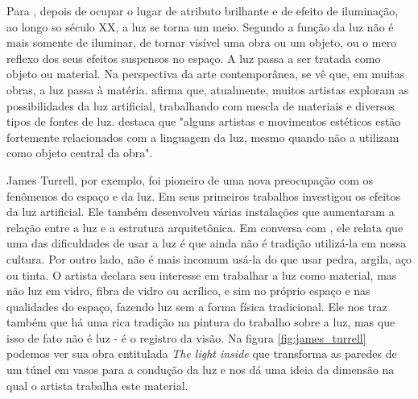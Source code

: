 Para , depois de ocupar o lugar de atributo brilhante e de efeito de iluminação, ao longo so século XX, a luz se torna um meio. Segundo  a função da luz não é mais somente de iluminar, de tornar visível uma obra ou um objeto, ou o mero reflexo dos seus efeitos suspensos no espaço. A luz passa a ser tratada como objeto ou material. Na perspectiva da arte contemporânea, se vê que, em muitas obras, a luz passa à matéria.  afirma que, atualmente, muitos artistas exploram as possibilidades da luz artificial, trabalhando com mescla de materiais e diversos tipos de fontes de luz.  destaca que "alguns artistas e movimentos estéticos estão fortemente relacionados com a linguagem da luz, mesmo quando não a utilizam como objeto central da obra". 


James Turrell, por exemplo, foi pioneiro de uma nova preocupação com os fenômenos do espaço e da luz. Em seus primeiros trabalhos investigou os efeitos da luz artificial. Ele também desenvolveu várias instalações que aumentaram a relação entre a luz e a estrutura arquitetônica. Em conversa com , ele relata que uma das dificuldades de usar a luz é que ainda não é tradição utilizá-la em nossa cultura. Por outro lado, não é mais incomum usá-la do que usar pedra, argila, aço ou tinta. O artista declara seu interesse em trabalhar a luz como material, mas não luz em vidro, fibra de vidro ou acrílico, e sim no próprio espaço e nas qualidades do espaço, fazendo luz sem a forma física tradicional. Ele nos traz também que há uma rica tradição na pintura do trabalho sobre a luz, mas que isso de fato não é luz - é o registro da visão. Na figura \ref{fig:james_turrell} podemos ver sua obra entitulada \textit{The light inside} que transforma as paredes de um túnel em vasos para a condução da luz e nos dá uma ideia da dimensão na qual o artista trabalha este material. 


